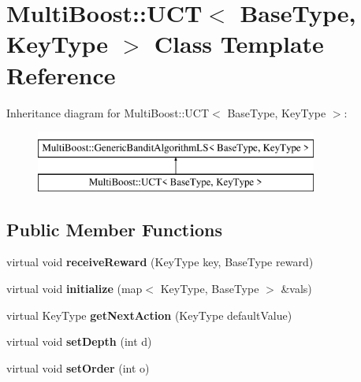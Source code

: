 \hypertarget{classMultiBoost_1_1UCT}{\section{Multi\-Boost\-:\-:U\-C\-T$<$ Base\-Type, Key\-Type $>$ Class Template Reference}
\label{classMultiBoost_1_1UCT}
}
Inheritance diagram for Multi\-Boost\-:\-:U\-C\-T$<$ Base\-Type, Key\-Type $>$\-:\begin{figure}[H]
\begin{center}
\leavevmode
\includegraphics[height=2.000000cm]{classMultiBoost_1_1UCT}
\end{center}
\end{figure}
\subsection*{Public Member Functions}
\begin{DoxyCompactItemize}
\item 
\hypertarget{classMultiBoost_1_1UCT_aec3ba442e9b2512ee94aa0fda66506bd}{virtual void {\bfseries receive\-Reward} (Key\-Type key, Base\-Type reward)}\label{classMultiBoost_1_1UCT_aec3ba442e9b2512ee94aa0fda66506bd}

\item 
\hypertarget{classMultiBoost_1_1UCT_a2201a8c1100ce35878d1dbe744ee1912}{virtual void {\bfseries initialize} (map$<$ Key\-Type, Base\-Type $>$ \&vals)}\label{classMultiBoost_1_1UCT_a2201a8c1100ce35878d1dbe744ee1912}

\item 
\hypertarget{classMultiBoost_1_1UCT_a67de6c3b5e7d0e08ed8ee6d3329cce62}{virtual Key\-Type {\bfseries get\-Next\-Action} (Key\-Type default\-Value)}\label{classMultiBoost_1_1UCT_a67de6c3b5e7d0e08ed8ee6d3329cce62}

\item 
\hypertarget{classMultiBoost_1_1UCT_ae2ee0945a34922afe077e8dc14fd873a}{virtual void {\bfseries set\-Depth} (int d)}\label{classMultiBoost_1_1UCT_ae2ee0945a34922afe077e8dc14fd873a}

\item 
\hypertarget{classMultiBoost_1_1UCT_ad75db5ac442e7b984add1a051dc0998a}{virtual void {\bfseries set\-Order} (int o)}\label{classMultiBoost_1_1UCT_ad75db5ac442e7b984add1a051dc0998a}

\end{DoxyCompactItemize}
